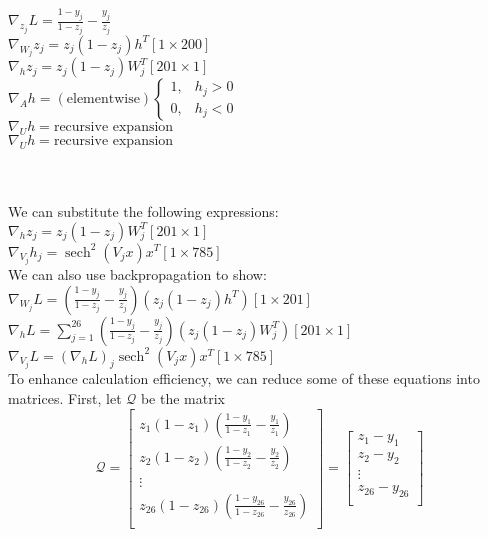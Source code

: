 \documentclass[landscape]{report}
\DeclareMathOperator{\sech}{sech} %
\newcommand{\tab}{\-\hspace{0.5cm}}
\begin{document}
$\nabla_{z_j} L = \frac{1-y_j}{1-z_j} - \frac{y_j}{z_j} $\\
$\nabla_{W_j} z_j = z_j(1-z_j)h^T$\tab\footnotesize$[1\times200]$\normalsize\\
$\nabla_{h} z_j = z_j(1-z_j)W_j^T$\tab\footnotesize$[201\times1]$\normalsize\\
$\nabla_{A} h = \left(\text{elementwise}\right) \begin{cases} 1, & h_j>0 \\ 0, & h_j<0 \end{cases} $\\
$\nabla_{U} h = \text{recursive expansion}$\\
$\nabla_{U} h = \text{recursive expansion}$

\-\\

\-\\

We can substitute the following expressions:\\
\tab$\nabla_{h} z_j = z_j(1-z_j)W_j^T$\tab\footnotesize$[201\times1]$\normalsize\\
\tab$\nabla_{V_j} h_j = \sech^2(V_jx)x^T $\tab\footnotesize$[1\times785]$\normalsize\\

We can also use backpropagation to show:\\
\tab$\nabla_{W_j} L = \left(\frac{1-y_j}{1-z_j} - \frac{y_j}{z_j}\right)\left(z_j(1-z_j) h^T\right)$\tab\footnotesize$[1\times201]$\normalsize\\
\tab$\nabla_{h} L = \sum_{j=1}^{26}{\left(\frac{1-y_j}{1-z_j} - \frac{y_j}{z_j}\right)\left(z_j(1-z_j)W_j^T\right)}$\tab\footnotesize$[201\times1]$\normalsize\\
\tab$\nabla_{V_j} L = \left(\nabla_{h} L\right)_j \sech^2(V_jx)x^T $\tab\footnotesize$[1\times785]$\normalsize\\

To enhance calculation efficiency, we can reduce some of these equations into matrices. First, let $\mathcal{Q}$ be the matrix
$$\mathcal{Q} = \begin{bmatrix}
z_1(1-z_1)\left(\frac{1-y_1}{1-z_1} - \frac{y_1}{z_1}\right)\\
z_2(1-z_2)\left(\frac{1-y_2}{1-z_2} - \frac{y_2}{z_2}\right)\\
\vdots \\
z_{26}(1-z_{26})\left(\frac{1-y_{26}}{1-z_{26}} - \frac{y_{26}}{z_{26}}\right)\\
\end{bmatrix} = \begin{bmatrix}
z_1 - y_1\\
z_2 - y_2 \\
\vdots \\
z_{26} - y_{26} \\
\end{bmatrix}$$
\end{document}
